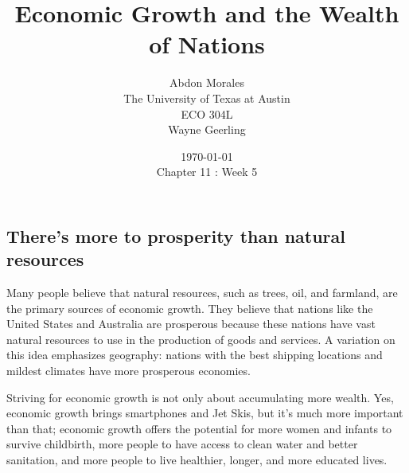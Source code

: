 \documentclass[11pt]{article} %
\title{Economic Growth and the Wealth of Nations}
\author{Abdon Morales \\ The University of Texas at Austin \\ ECO 304L \\ Wayne Geerling}
\date{\today \\ Chapter 11 : Week 5}
\begin{document}
\maketitle
\subsection*{There's more to prosperity than natural resources}

Many people believe that natural resources, such as trees, oil, and farmland, are the primary sources of economic growth. They believe that nations like the United States and Australia are prosperous because these nations have vast natural resources to use in the production of goods and services. A variation on this idea emphasizes geography: nations with the best shipping locations and mildest climates have more prosperous economies.

Striving for economic growth is not only about accumulating more wealth. Yes, economic growth brings smartphones and Jet Skis, but it's much more important than that; economic growth offers the potential for more women and infants to survive childbirth, more people to have access to clean water and better sanitation, and more people to live healthier, longer, and more educated lives.
\end{document}
